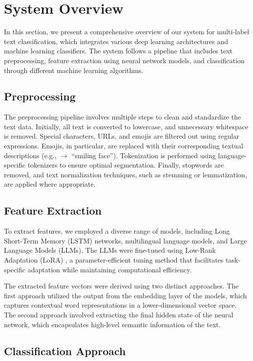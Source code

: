 \section{System Overview}

In this section, we present a comprehensive overview of our system for multi-label text classification, which integrates various deep learning architectures and machine learning classifiers. The system follows a pipeline that includes text preprocessing, feature extraction using neural network models, and classification through different machine learning algorithms.

\subsection{Preprocessing}

The preprocessing pipeline involves multiple steps to clean and standardize the text data. Initially, all text is converted to lowercase, and unnecessary whitespace is removed. Special characters, URLs, and emojis are filtered out using regular expressions. Emojis, in particular, are replaced with their corresponding textual descriptions (e.g., \smiley $\rightarrow$ ``smiling face''). Tokenization is performed using language-specific tokenizers to ensure optimal segmentation. Finally, stopwords are removed, and text normalization techniques, such as stemming or lemmatization, are applied where appropriate.

\subsection{Feature Extraction}

To extract features, we employed a diverse range of models, including Long Short-Term Memory (LSTM) networks, multilingual language models, and Large Language Models (LLMs). The LLMs were fine-tuned using Low-Rank Adaptation (LoRA) \citep{hu2021lora}, a parameter-efficient tuning method that facilitates task-specific adaptation while maintaining computational efficiency.

The extracted feature vectors were derived using two distinct approaches. The first approach utilized the output from the embedding layer of the models, which captures contextual word representations in a lower-dimensional vector space. The second approach involved extracting the final hidden state of the neural network, which encapsulates high-level semantic information of the text.

\subsection{Classification Approach}

